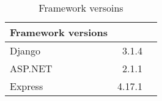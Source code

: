 \begin{table}[!htp]\centering
\caption{Framework versoins}\label{tab:software}
\scriptsize
\begin{tabular}{lrr}\toprule
Framework versions & \\\midrule
Django &3.1.4 \\
ASP.NET &2.1.1 \\
Express &4.17.1 \\
\bottomrule
\end{tabular}
\end{table}